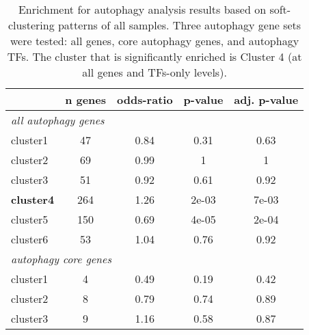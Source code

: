         
             \begin{table}[!h]
            \centering
            \footnotesize
            \caption[Enrichment analysis results based on soft-clustering data]{Enrichment for autophagy analysis results based on soft-clustering patterns of all samples. Three autophagy gene sets were tested: all genes, core autophagy genes, and autophagy TFs. The cluster that is significantly enriched is Cluster 4 (at all genes and TFs-only levels). }
            \label{table:mfuzzall}
            \begin{tabular}{lcccc}
            \multicolumn{1}{l|}{} & \multicolumn{1}{l|}{\textbf{n genes}} & \multicolumn{1}{l|}{\textbf{odds-ratio}} & \multicolumn{1}{l|}{\textbf{p-value}} & \multicolumn{1}{l}{\textbf{adj. p-value}} \\ \hline
            \multicolumn{5}{l}{\textit{all autophagy genes}} \\ \hline
            \multicolumn{1}{l|}{cluster1} & \multicolumn{1}{c|}{47} & \multicolumn{1}{c|}{0.84} & \multicolumn{1}{c|}{0.31} & 0.63 \\ \hline
            \multicolumn{1}{l|}{cluster2} & \multicolumn{1}{c|}{69} & \multicolumn{1}{c|}{0.99} & \multicolumn{1}{c|}{1} & 1 \\ \hline
            \multicolumn{1}{l|}{cluster3} & \multicolumn{1}{c|}{51} & \multicolumn{1}{c|}{0.92} & \multicolumn{1}{c|}{0.61} & 0.92 \\ \hline
            \multicolumn{1}{l|}{\textbf{cluster4}} & \multicolumn{1}{c|}{264} & \multicolumn{1}{c|}{1.26} & \multicolumn{1}{c|}{2e-03} & 7e-03 \\ \hline
            \multicolumn{1}{l|}{cluster5} & \multicolumn{1}{c|}{150} & \multicolumn{1}{c|}{0.69} & \multicolumn{1}{c|}{4e-05} & 2e-04 \\ \hline
            \multicolumn{1}{l|}{cluster6} & \multicolumn{1}{c|}{53} & \multicolumn{1}{c|}{1.04} & \multicolumn{1}{c|}{0.76} & 0.92 \\ \hline
            \multicolumn{5}{l}{\textit{autophagy core genes}} \\ \hline
            \multicolumn{1}{l|}{cluster1} & \multicolumn{1}{c|}{4} & \multicolumn{1}{c|}{0.49} & \multicolumn{1}{c|}{0.19} & 0.42 \\ \hline
            \multicolumn{1}{l|}{cluster2} & \multicolumn{1}{c|}{8} & \multicolumn{1}{c|}{0.79} & \multicolumn{1}{c|}{0.74} & 0.89 \\ \hline
            \multicolumn{1}{l|}{cluster3} & \multicolumn{1}{c|}{9} & \multicolumn{1}{c|}{1.16} & \multicolumn{1}{c|}{0.58} & 0.87 \\ \hline

\end{tabular}
\end{table}
